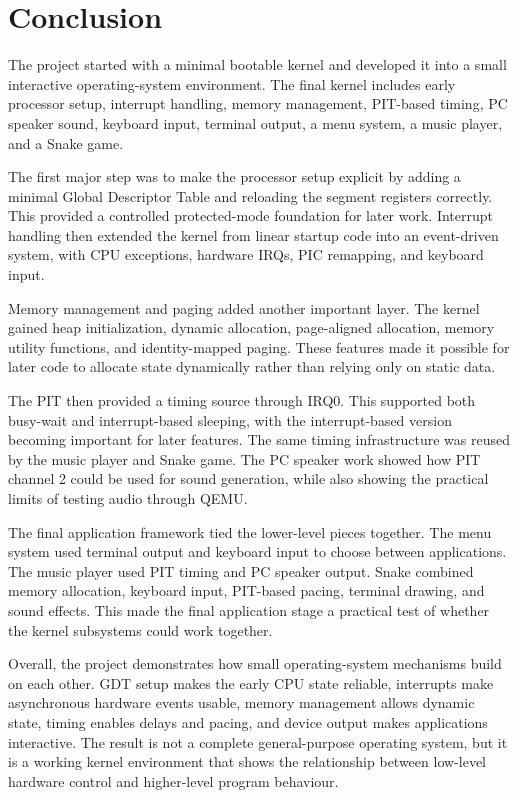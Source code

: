 \section{Conclusion}

The project started with a minimal bootable kernel and developed it into a small interactive operating-system environment. The final kernel includes early processor setup, interrupt handling, memory management, PIT-based timing, PC speaker sound, keyboard input, terminal output, a menu system, a music player, and a Snake game.

The first major step was to make the processor setup explicit by adding a minimal Global Descriptor Table and reloading the segment registers correctly. This provided a controlled protected-mode foundation for later work. Interrupt handling then extended the kernel from linear startup code into an event-driven system, with CPU exceptions, hardware IRQs, PIC remapping, and keyboard input.

Memory management and paging added another important layer. The kernel gained heap initialization, dynamic allocation, page-aligned allocation, memory utility functions, and identity-mapped paging. These features made it possible for later code to allocate state dynamically rather than relying only on static data.

The PIT then provided a timing source through IRQ0. This supported both busy-wait and interrupt-based sleeping, with the interrupt-based version becoming important for later features. The same timing infrastructure was reused by the music player and Snake game. The PC speaker work showed how PIT channel 2 could be used for sound generation, while also showing the practical limits of testing audio through QEMU.

The final application framework tied the lower-level pieces together. The menu system used terminal output and keyboard input to choose between applications. The music player used PIT timing and PC speaker output. Snake combined memory allocation, keyboard input, PIT-based pacing, terminal drawing, and sound effects. This made the final application stage a practical test of whether the kernel subsystems could work together.

Overall, the project demonstrates how small operating-system mechanisms build on each other. GDT setup makes the early CPU state reliable, interrupts make asynchronous hardware events usable, memory management allows dynamic state, timing enables delays and pacing, and device output makes applications interactive. The result is not a complete general-purpose operating system, but it is a working kernel environment that shows the relationship between low-level hardware control and higher-level program behaviour.

